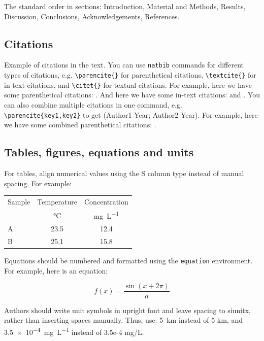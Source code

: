 \documentclass{forestrystudies}
\begin{document}
The standard order in sections: Introduction, Material and Methods, Results, Discussion, Conclusions, Acknowledgements, References.

\subsection*{Citations}

Example of citations in the text. You can use \texttt{natbib} commands for different types of citations, e.g. \texttt{\textbackslash parencite\{\}} for parenthetical citations, \texttt{\textbackslash textcite\{\}} for in-text citations, and \texttt{\textbackslash citet\{\}} for textual citations. For example, here we have some parenthetical citations: \cite{mercuri2023water} \cite{hariSmear2005}. And here we have some in-text citations: \textcite{Baldocchi.gcb.12649} and \textcite{NoeSmear2015}. You can also combine multiple citations in one command, e.g. \texttt{\textbackslash parencite\{key1,key2\}} to get (Author1 Year; Author2 Year). For example, here we have some combined parenthetical citations: \parencite{mercuri2023water} \parencite{hariSmear2005}.

\subsection*{Tables, figures, equations and units}

For tables, align numerical values using the S column type instead of manual spacing. For example:

\begin{tabular}{l S S}
  \toprule
  Sample & {Temperature} & {Concentration} \\
  & {\unit{\celsius}} & {\unit{\milli\gram\per\liter}} \\
  \midrule
  A      & 23.5  & 12.4 \\
  B      & 25.1  & 15.8 \\
  \bottomrule
\end{tabular}

Equations should be numbered and formatted using the \texttt{equation} environment. For example, here is an equation:

%
\begin{equation}
  f(x) = \frac{\sin(x+2\pi)}{a}
\end{equation}

Authors should write unit symbols in upright font and leave spacing to siunitx, rather than inserting spaces manually. Thus, use: \qty{5}{\kilo\meter} instead of 5 km, and \qty{3.5e-4}{\milli\gram\per\liter} instead of 3.5e-4 mg/L.
\end{document}
